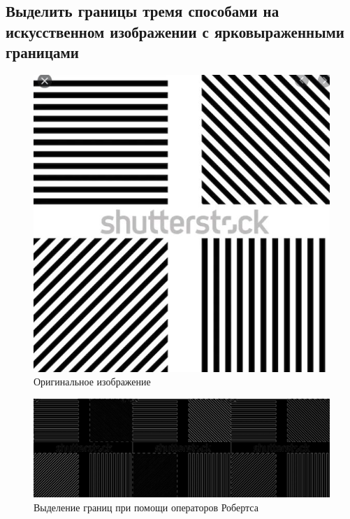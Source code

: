 \subsection{Выделить границы тремя способами на искусственном изображении с ярковыраженными границами}
\begin{figure}[H]
	\begin{center}
		\includegraphics[scale=0.5]{lines.JPG}
		\caption{Оригинальное изображение} 
		\label{pic:hist_orig} %
	\end{center}
\end{figure}
\begin{figure}[H]
	\begin{center}
		\includegraphics[scale=0.25]{robrts_all_1.jpg}
		\caption{Выделение границ при помощи операторов Робертса} 
		\label{pic:hist_orig} %
	\end{center}
\end{figure}
